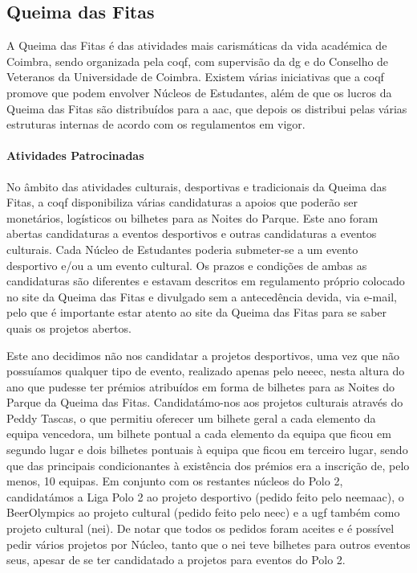 
\subsection{Queima das Fitas}

A Queima das Fitas é das atividades mais carismáticas da vida académica de Coimbra, sendo organizada pela \acrfull{coqf}, com supervisão da \acrshort{dg} e do Conselho de Veteranos da Universidade de Coimbra. Existem várias iniciativas que a \acrshort{coqf} promove que podem envolver Núcleos de Estudantes, além de que os lucros da Queima das Fitas são distribuídos para a \acrshort{aac}, que depois os distribui pelas várias estruturas internas de acordo com os regulamentos em vigor.

\paragraph{Atividades Patrocinadas}

No âmbito das atividades culturais, desportivas e tradicionais da Queima das Fitas, a \acrshort{coqf} disponibiliza várias candidaturas a apoios que poderão ser monetários, logísticos ou bilhetes para as Noites do Parque. Este ano foram abertas candidaturas a eventos desportivos e outras candidaturas a eventos culturais. Cada Núcleo de Estudantes poderia submeter-se a um evento desportivo e/ou a um evento cultural. Os prazos e condições de ambas as candidaturas são diferentes e estavam descritos em regulamento próprio colocado no site da Queima das Fitas e divulgado sem a antecedência devida, via e-mail, pelo que é importante estar atento ao site da Queima das Fitas para se saber quais os projetos abertos.

Este ano decidimos não nos candidatar a projetos desportivos, uma vez que não possuíamos qualquer tipo de evento, realizado apenas pelo \acrshort{neeec}, nesta altura do ano que pudesse ter prémios atribuídos em forma de bilhetes para as Noites do Parque da Queima das Fitas. Candidatámo-nos aos projetos culturais através do Peddy Tascas, o que permitiu oferecer um bilhete geral a cada elemento da equipa vencedora, um bilhete pontual a cada elemento da equipa que ficou em segundo lugar e dois bilhetes pontuais à equipa que ficou em terceiro lugar, sendo que das principais condicionantes à existência dos prémios era a inscrição de, pelo menos, 10 equipas.
Em conjunto com os restantes núcleos do Polo 2, candidatámos a Liga Polo 2 ao projeto desportivo (pedido feito pelo \acrshort{neemaac}), o BeerOlympics ao projeto cultural (pedido feito pelo \acrshort{neec}) e a \acrfull{ugf} também como projeto cultural (\acrshort{nei}). De notar que todos os pedidos foram aceites e é possível pedir vários projetos por Núcleo, tanto que o \acrshort{nei} teve bilhetes para outros eventos seus, apesar de se ter candidatado a projetos para eventos do Polo 2.

